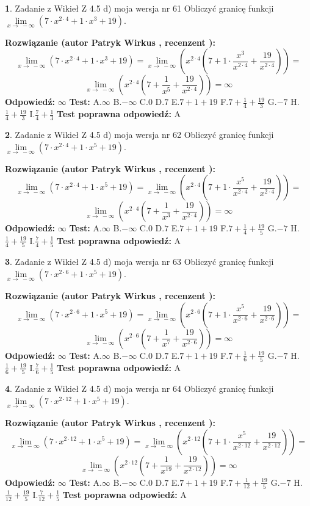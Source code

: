 \documentclass[12pt, a4paper]{article}
\theoremstyle{definition} %
\newtheorem{zad}{}
\newcommand{\zadStart}[1]{\begin{zad}#1\newline}
\newcommand{\zadStop}{\end{zad}}
\newcommand{\rozwStart}[2]{\noindent \textbf{Rozwiązanie (autor #1 , recenzent #2): }\newline}
\newcommand{\rozwStop}{\newline}
\newcommand{\odpStart}{\noindent \textbf{Odpowiedź:}\newline}
\newcommand{\odpStop}{\newline}
\newcommand{\testStart}{\noindent \textbf{Test:}\newline}
\newcommand{\testStop}{\newline}
\newcommand{\kluczStart}{\noindent \textbf{Test poprawna odpowiedź:}\newline}
\newcommand{\kluczStop}{\newline}
\begin{document}
\zadStart{Zadanie z Wikieł Z 4.5 d) moja wersja nr 61}
Obliczyć granicę funkcji  $\lim\limits_{x\to\ -\infty}(7 \cdot x^{2\cdot4}+1 \cdot x^{3}+19)$.
\zadStop
\rozwStart{Patryk Wirkus}{}
$$\lim\limits_{x\to\ -\infty}(7 \cdot x^{2\cdot4}+1 \cdot x^{3}+19) = \lim\limits_{x\to\ -\infty}(x^{2\cdot4}(7 +1 \cdot \frac{x^{3}}{x^{2\cdot4}}+\frac{19}{x^{2\cdot4}})) =$$ $$\lim\limits_{x\to\ -\infty}(x^{2\cdot4}(7 +\frac{1}{x^{5}}+\frac{19}{x^{2\cdot4}})) =\infty$$
\rozwStop
\odpStart
$\infty$
\odpStop
\testStart
A.$\infty$ B.$-\infty$ C.$0$ D.$7$ E.$7 + 1 + 19$
F.$7+\frac{1}{4}+\frac{19}{3}$ G.$-7$
H.$\frac{1}{4}+\frac{19}{3}$
I.$\frac{7}{4}+\frac{1}{3}$
\testStop
\kluczStart
A
\kluczStop



\zadStart{Zadanie z Wikieł Z 4.5 d) moja wersja nr 62}
Obliczyć granicę funkcji  $\lim\limits_{x\to\ -\infty}(7 \cdot x^{2\cdot4}+1 \cdot x^{5}+19)$.
\zadStop
\rozwStart{Patryk Wirkus}{}
$$\lim\limits_{x\to\ -\infty}(7 \cdot x^{2\cdot4}+1 \cdot x^{5}+19) = \lim\limits_{x\to\ -\infty}(x^{2\cdot4}(7 +1 \cdot \frac{x^{5}}{x^{2\cdot4}}+\frac{19}{x^{2\cdot4}})) =$$ $$\lim\limits_{x\to\ -\infty}(x^{2\cdot4}(7 +\frac{1}{x^{3}}+\frac{19}{x^{2\cdot4}})) =\infty$$
\rozwStop
\odpStart
$\infty$
\odpStop
\testStart
A.$\infty$ B.$-\infty$ C.$0$ D.$7$ E.$7 + 1 + 19$
F.$7+\frac{1}{4}+\frac{19}{5}$ G.$-7$
H.$\frac{1}{4}+\frac{19}{5}$
I.$\frac{7}{4}+\frac{1}{5}$
\testStop
\kluczStart
A
\kluczStop



\zadStart{Zadanie z Wikieł Z 4.5 d) moja wersja nr 63}
Obliczyć granicę funkcji  $\lim\limits_{x\to\ -\infty}(7 \cdot x^{2\cdot6}+1 \cdot x^{5}+19)$.
\zadStop
\rozwStart{Patryk Wirkus}{}
$$\lim\limits_{x\to\ -\infty}(7 \cdot x^{2\cdot6}+1 \cdot x^{5}+19) = \lim\limits_{x\to\ -\infty}(x^{2\cdot6}(7 +1 \cdot \frac{x^{5}}{x^{2\cdot6}}+\frac{19}{x^{2\cdot6}})) =$$ $$\lim\limits_{x\to\ -\infty}(x^{2\cdot6}(7 +\frac{1}{x^{7}}+\frac{19}{x^{2\cdot6}})) =\infty$$
\rozwStop
\odpStart
$\infty$
\odpStop
\testStart
A.$\infty$ B.$-\infty$ C.$0$ D.$7$ E.$7 + 1 + 19$
F.$7+\frac{1}{6}+\frac{19}{5}$ G.$-7$
H.$\frac{1}{6}+\frac{19}{5}$
I.$\frac{7}{6}+\frac{1}{5}$
\testStop
\kluczStart
A
\kluczStop



\zadStart{Zadanie z Wikieł Z 4.5 d) moja wersja nr 64}
Obliczyć granicę funkcji  $\lim\limits_{x\to\ -\infty}(7 \cdot x^{2\cdot12}+1 \cdot x^{5}+19)$.
\zadStop
\rozwStart{Patryk Wirkus}{}
$$\lim\limits_{x\to\ -\infty}(7 \cdot x^{2\cdot12}+1 \cdot x^{5}+19) = \lim\limits_{x\to\ -\infty}(x^{2\cdot12}(7 +1 \cdot \frac{x^{5}}{x^{2\cdot12}}+\frac{19}{x^{2\cdot12}})) =$$ $$\lim\limits_{x\to\ -\infty}(x^{2\cdot12}(7 +\frac{1}{x^{19}}+\frac{19}{x^{2\cdot12}})) =\infty$$
\rozwStop
\odpStart
$\infty$
\odpStop
\testStart
A.$\infty$ B.$-\infty$ C.$0$ D.$7$ E.$7 + 1 + 19$
F.$7+\frac{1}{12}+\frac{19}{5}$ G.$-7$
H.$\frac{1}{12}+\frac{19}{5}$
I.$\frac{7}{12}+\frac{1}{5}$
\testStop
\kluczStart
A
\kluczStop
\end{document}

